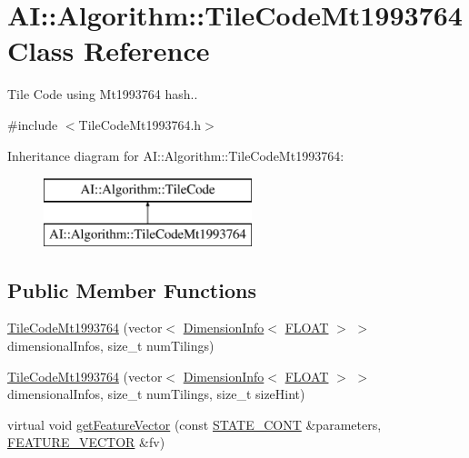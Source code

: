 \hypertarget{classAI_1_1Algorithm_1_1TileCodeMt1993764}{\section{A\+I\+:\+:Algorithm\+:\+:Tile\+Code\+Mt1993764 Class Reference}
\label{classAI_1_1Algorithm_1_1TileCodeMt1993764}
}


Tile Code using Mt1993764 hash..  




{\ttfamily \#include $<$Tile\+Code\+Mt1993764.\+h$>$}

Inheritance diagram for A\+I\+:\+:Algorithm\+:\+:Tile\+Code\+Mt1993764\+:\begin{figure}[H]
\begin{center}
\leavevmode
\includegraphics[height=2.000000cm]{classAI_1_1Algorithm_1_1TileCodeMt1993764}
\end{center}
\end{figure}
\subsection*{Public Member Functions}
\begin{DoxyCompactItemize}
\item 
\hyperlink{classAI_1_1Algorithm_1_1TileCodeMt1993764_a0d8eee3e74ccf5587d1f376e9c54a33f}{Tile\+Code\+Mt1993764} (vector$<$ \hyperlink{classAI_1_1Algorithm_1_1DimensionInfo}{Dimension\+Info}$<$ \hyperlink{namespaceAI_a41b74884a20833db653dded3918e05c3}{F\+L\+O\+A\+T} $>$ $>$ dimensional\+Infos, size\+\_\+t num\+Tilings)
\item 
\hyperlink{classAI_1_1Algorithm_1_1TileCodeMt1993764_a6062251f25cab695518db0fda5f97dc6}{Tile\+Code\+Mt1993764} (vector$<$ \hyperlink{classAI_1_1Algorithm_1_1DimensionInfo}{Dimension\+Info}$<$ \hyperlink{namespaceAI_a41b74884a20833db653dded3918e05c3}{F\+L\+O\+A\+T} $>$ $>$ dimensional\+Infos, size\+\_\+t num\+Tilings, size\+\_\+t size\+Hint)
\item 
virtual void \hyperlink{classAI_1_1Algorithm_1_1TileCodeMt1993764_a8d3e8fd183947d9dcb19e63139ea0871}{get\+Feature\+Vector} (const \hyperlink{namespaceAI_aff63ec21d97dd5f086fddbc3103f5707}{S\+T\+A\+T\+E\+\_\+\+C\+O\+N\+T} \&parameters, \hyperlink{namespaceAI_a23a39e1b301a5c1345fa508796940631}{F\+E\+A\+T\+U\+R\+E\+\_\+\+V\+E\+C\+T\+O\+R} \&fv)
\end{DoxyCompactItemize}
